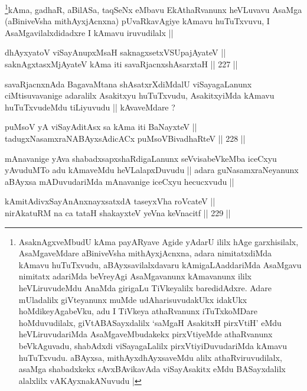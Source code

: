 \begin{artha}
\footnote{AsaknAgxveMbudU kAma payARyave Agide yAdarU ililx hAge garxhisilalx,
AsaMgaveMdare aBiniveVsha mithAyxjAcnxna, adara nimitatxdiMda kAmavu
huTuTxvudu, aBAyxsavilalxdavaru kAmigaLAaddariMda AsaMgavu
nimitatx adariMda beVreyAgi AsaMgavanunx kAmavanunx ililx
heVLiruvudeMdu AnaMda girigaLu TiVkeyalilx baredidAdxre. Adare
mUladalilx giVteyanunx muMde udAharisuvudakUkx idakUkx
hoMdikeyAgabeVku, adu I TiVkeya athaRvanunx iTuTxkoMDare
hoMduvudilalx, giVtABASayxdalilx `saMgaH AsakitxH pirxVtiH' eMdu
heVLiruvudariMda AsaMgaveMbudakekx pirxVtiyeMde athaRvanunx
beVkAguvadu, shabAdxdi viSayagaLalilx  pirxVtiyiDuvudariMda kAmavu
huTuTxvudu. aBAyxsa, mithAyxdhAyxsaveMdu alilx athaRviruvudilalx,
asaMga shabadxkekx sAvxBAvikavAda viSayAsakitx eMdu BASayxdalilx
alalxlilx vAKAyxnakANuvudu |}kAma, gadhaR, aBilASa, taqSeNx eMbavu EkAthaRvanunx
heVLuvavu AsaMga (aBiniveVsha mithAyxjAcnxna) pUvaRkavAgiye kAmavu
huTuTxvuvu, I AsaMgavilalxdidadxre I kAmavu iruvudilalx ||
\end{artha}


\begin{shl}
dhAyxyatoV viSayAnupxMsaH saknagxsetxVSUpajAyateV || \\
saknAgxtasxMjAyateV kAma iti savaRjacnxshAsarxtaH ||  227 ||  
\end{shl}

\begin{artha}
savaRjacnxnAda BagavaMtana shAsatxrXdiMdalU viSayagaLanunx
ciMtisuvavanige adaralilx Asakitxyu huTuTxvudu, AsakitxyiMda kAmavu
huTuTxvudeMdu tiLiyuvudu || kAvaveMdare ?
\end{artha}

\begin{shl}
puMsoV yA viSayAditAsx sa kAma iti BaNayxteV || \\
tadugxNasamxraNABAyxsAdicACx puMsoV\s BivadhaRteV ||  228 ||  
\end{shl}

\begin{artha}
mAnavanige yAva shabadxsapxshaRdigaLanunx seVvisabeVkeMba iceCxyu
yAvuduMTo adu kAmaveMdu heVLalapxDuvudu || adara guNasamxraNeyanunx
aBAyxsa mADuvudariMda mAnavanige iceCxyu hecucxvudu ||
\end{artha}

\begin{shl}
kAmitAdivxSayAnAnxnayxsatxdA taseyxVha roVcateV || \\
nirAkatuRM na ca tataH shakayxteV yeVna keVnacitf ||  229 ||  
\end{shl}

